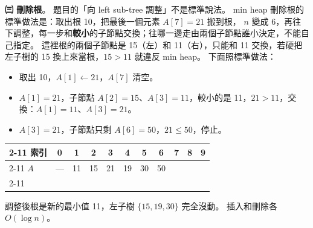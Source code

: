 \begin{pastsoln}
\textbf{㈢ 刪除根}。 題目的「向 left sub-tree 調整」不是標準說法。 min heap 刪除根的標準做法是：取出根 10，把最後一個元素 $A[7] = 21$ 搬到根，
$n$ 變成 $6$，再往下調整，每一步和\textbf{較小}的子節點交換；往哪一邊走由兩個子節點誰小決定，不能自己指定。 這裡根的兩個子節點是
15（左）和 11（右），只能和 11 交換，若硬把左子樹的 15 換上來當根，$15 > 11$ 就違反 min heap。 下面照標準做法：
\begin{itemize}
\item 取出 10，$A[1] \gets 21$，$A[7]$ 清空。
\item $A[1] = 21$，子節點 $A[2] = 15$、$A[3] = 11$，較小的是 11，$21 > 11$，交換：$A[1] = 11$、$A[3] = 21$。
\item $A[3] = 21$，子節點只剩 $A[6] = 50$，$21 \le 50$，停止。
\end{itemize}
\begin{center}
\qquad
\begin{tabular}[b]{l|*{10}{c|}}
\cline{2-11}
索引 & 0 & 1 & 2 & 3 & 4 & 5 & 6 & 7 & 8 & 9 \\ \cline{2-11}
$A$ & — & 11 & 15 & 21 & 19 & 30 & 50 & & & \\ \cline{2-11}
\end{tabular}
\end{center}
調整後根是新的最小值 11，左子樹 $\{15, 19, 30\}$ 完全沒動。 插入和刪除各 $O(\log n)$。
\end{pastsoln}
